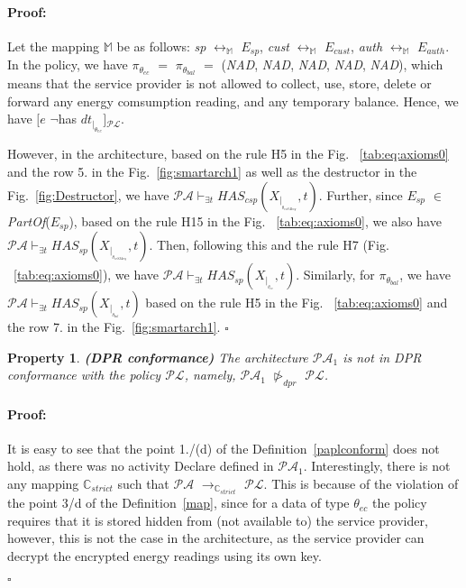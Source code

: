 \documentclass[a4paper]{article}
\newtheorem{ttp}{Property}
\newenvironment{proof}{\paragraph{Proof:}}{\hfill$\square$}
\begin{document}
\begin{proof}
Let the mapping $\mathbb{M}$ be as follows: \textit{sp} $\leftrightarrow_\mathbb{M}$ $E_{sp}$, \textit{cust} $\leftrightarrow_\mathbb{M}$ $E_{cust}$, \textit{auth} $\leftrightarrow_\mathbb{M}$ $E_{auth}$.  In the policy, we have $\pi_{\theta_{ec}}$ $=$ $\pi_{\theta_{bal}}$ $=$ (\textit{NAD}, \textit{NAD}, \textit{NAD}, \textit{NAD}, \textit{NAD}), which means that the service provider is not allowed to collect, use, store, delete or forward any energy comsumption  reading, and any temporary balance. Hence, we have $[e$ $\neg$has $dt_{|_{\theta_{ec}}}]$$_{\mathcal{P}\mathcal{L}}$.     

However, in the architecture, based on the rule H5 in the Fig.
~\ref{tab:eq:axioms0} and the row 5. in the Fig.~\ref{fig:smartarch1} as well as the destructor in the Fig.~\ref{fig:Destructor}, we have $\mathcal{P}\mathcal{A} \vdash_{\exists t} \textit{HAS}_{csp}\left(X_{|_{_{\theta_{ecSAkey}}}}, t \right)$. Further, since $E_{sp}$ $\in$ \textit{PartOf}($E_{sp}$), based on the rule H15 in the Fig.
~\ref{tab:eq:axioms0}, we also have $\mathcal{P}\mathcal{A} \vdash_{\exists t} \textit{HAS}_{sp}\left(X_{|_{_{\theta_{ecSAkey}}}}, t \right)$. Then, following this and the rule H7 (Fig.
~\ref{tab:eq:axioms0}), we have $\mathcal{P}\mathcal{A} \vdash_{\exists t} \textit{HAS}_{sp}\left(X_{|_{_{\theta_{ec}}}}, t \right)$. Similarly, for  $\pi_{\theta_{bal}}$, we have $\mathcal{P}\mathcal{A} \vdash_{\exists t} \textit{HAS}_{sp}\left(X_{|_{_{\theta_{bal}}}}, t \right)$ based on the rule H5 in the Fig.
~\ref{tab:eq:axioms0} and the row 7. in the Fig.~\ref{fig:smartarch1}. 
\end{proof} 

\begin{ttp} \textbf{(DPR conformance)}
The architecture $\mathcal{P}$$\mathcal{A}_1$ is \textit{not in DPR conformance} with the policy $\mathcal{P}$$\mathcal{L}$, namely, $\mathcal{P}$$\mathcal{A}_1$ $\ntriangleright_{dpr}$ $\mathcal{P}$$\mathcal{L}$.   
\end{ttp}
\begin{proof} 
It is easy to see that the point 1./(d) of the Definition~\ref{paplconform} does not hold, as there was no activity Declare  defined in $\mathcal{P}\mathcal{A}_1$. 
Interestingly, there is not any mapping $\mathbb{C}_{strict}$ such that $\mathcal{P}\mathcal{A}$ $\rightarrow_{\mathbb{C}_{strict}}$ $\mathcal{P}\mathcal{L}$. This is because of the violation of the point 3/d of the Definition~\ref{map}, since for a data of type $\theta_{ec}$ the policy requires that it is stored hidden from (not available to) the service provider, however, this is not the case in the architecture, as the service provider can decrypt the encrypted energy readings using its own key. 

\end{proof} 
\end{document}
